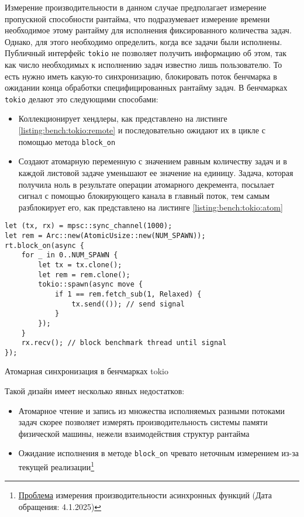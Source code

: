 Измерение производительности в данном случае предполагает измерение пропускной способности рантайма, что подразумевает измерение времени необходимое этому рантайму для исполнения фиксированного количества задач. Однако, для этого необходимо определить, когда все задачи были исполнены. Публичный интерфейс \verb|tokio| не позволяет получить информацию об этом, так как число необходимых к исполнению задач известно лишь пользователю. То есть нужно иметь какую-то синхронизацию, блокировать поток бенчмарка в ожидании конца обработки специфицированных рантайму задач. В бенчмарках \verb|tokio| делают это следующими способами:

\begin{itemize}
    \item Коллекционирует хендлеры, как представлено на листинге \ref{listing:bench:tokio:remote} и последовательно ожидают их в цикле с помощью метода \verb|block_on|
    \item Создают атомарную переменную с значением равным количеству задач и в каждой листовой задаче уменьшают ее значение на единицу. Задача, которая получила ноль в результате операции атомарного декремента, посылает сигнал с помощью блокирующего канала в главный поток, тем самым разблокирует его, как представлено на листинге \ref{listing:bench:tokio:atom}
\end{itemize}

\begin{listing}[H]
    \begin{verbatim}
let (tx, rx) = mpsc::sync_channel(1000);
let rem = Arc::new(AtomicUsize::new(NUM_SPAWN));
rt.block_on(async {
    for _ in 0..NUM_SPAWN {
        let tx = tx.clone();
        let rem = rem.clone();
        tokio::spawn(async move {
            if 1 == rem.fetch_sub(1, Relaxed) {
                tx.send(()); // send signal
            }
        });
    }
    rx.recv(); // block benchmark thread until signal
});
    \end{verbatim}

    \caption{Атомарная синхронизация в бенчмарках tokio}
    \label{listing:bench:tokio:atom}
\end{listing}

Такой дизайн имеет несколько явных недостатков:

\begin{itemize}
    \item Атомарное чтение и запись из множества исполняемых разными потоками задач скорее позволяет измерять производительность системы памяти физической машины, нежели взаимодействия структур рантайма
    \item Ожидание исполнения в методе \verb|block_on| чревато неточным измерением из-за текущей реализации\footnote{\href{https://github.com/bheisler/criterion.rs/issues/819}{Проблема} измерения производительности асинхронных функций (Дата обращения: 4.1.2025)}
\end{itemize}


